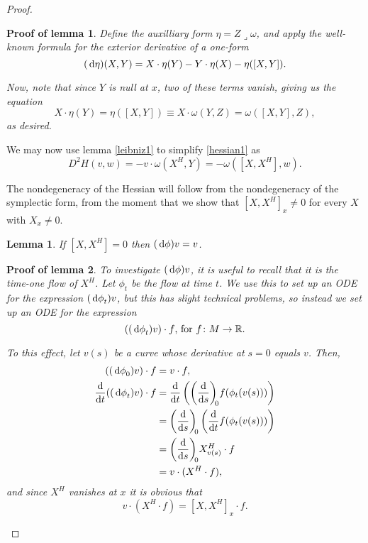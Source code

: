 \documentclass{article}
\newtheorem{lemma}{Lemma}
\theoremstyle{nonumberplain}
\newtheorem{proof}{Proof}
\newtheorem{lemmaproof}{Proof of lemma}
\newcommand{\R}{\mathbb{R}}
\newcommand{\into}{\mathbin{\lrcorner}}
\begin{document}
\begin{proof}
\begin{lemmaproof}
Define the auxilliary form $\eta = Z \into \omega$, and apply the well-known formula for the exterior derivative of a one-form
\begin{equation}
(\dl \eta)(X,Y) = X \cdot \eta(Y) - Y \cdot \eta(X) - \eta([X,Y]).
\end{equation}

Now, note that since $Y$ is null at $x$, two of these terms vanish, giving us the equation
\begin{equation}
X \cdot \eta(Y) = \eta([X,Y]) \equiv X \cdot \omega(Y,Z) = \omega([X,Y],Z),
\end{equation}
as desired.
\end{lemmaproof}

We may now use lemma \ref{leibniz1} to simplify \eqref{hessian1} as
\begin{equation}
D^2 H(v,w) = - v \cdot \omega(X^H, Y) = - \omega([X,X^H], w).
\end{equation}

The nondegeneracy of the Hessian will follow from the nondegeneracy of the symplectic form, from the moment that we show that $[X,X^H]_x \neq 0$ for every $X$ with $X_x \neq 0$.

\begin{lemma}\label{bracketnondegen}
If $[X,X^H] = 0$ then $(\dl \phi) v = v$.
\end{lemma}

\begin{lemmaproof}
To investigate $(\dl \phi) v$, it is useful to recall that it is the time-one flow of $X^H$. Let $\phi_t$ be the flow at time $t$. We use this to set up an ODE for the expression $(\dl \phi_t) v$, but this has slight technical problems, so instead we set up an ODE for the expression
\begin{equation}
((\dl \phi_t) v) \cdot f\text{, for $f \colon M \to \R$.}
\end{equation}

To this effect, let $v(s)$ be a curve whose derivative at $s=0$ equals $v$. Then,
\begin{equation}
\begin{split}
((\dl \phi_0) v) \cdot f &= v \cdot f,\\
\diff*{((\dl \phi_t) v) \cdot f}t &= \diff{}t \left( \diff{}s[0] f(\phi_t(v(s))) \right)\\
&= \diff{}s[0] \left( \diff{}t f(\phi_t(v(s)))\right)\\
&= \diff{}s[0] X^H_{v(s)} \cdot f\\
&= v \cdot (X^H \cdot f),
\end{split}
\end{equation}
and since $X^H$ vanishes at $x$ it is obvious that
\begin{equation}
v \cdot (X^H \cdot f) = [X,X^H]_x \cdot f.
\end{equation}


\end{lemmaproof}
\end{proof}
\end{document}

